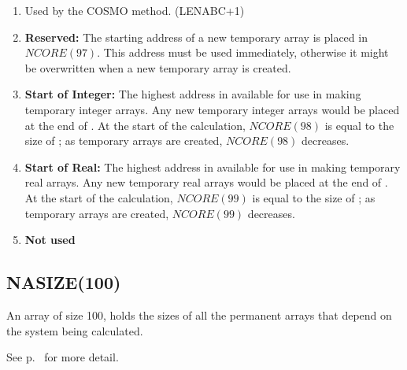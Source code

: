 \begin{enumerate}
\item {} Used by the COSMO method. (LENABC+1)
\addtocounter{enumi}{12}
\item {\bf Reserved:} The starting address of a new temporary array is
placed in $NCORE(97)$.  This address must be used immediately, otherwise
it might be overwritten when a new temporary array is created.
\item {\bf Start of Integer:} The highest address in  available
for use in making temporary integer arrays. Any new temporary integer arrays
would be placed at the end of .  At the start of the calculation,
$NCORE(98)$ is equal to the size of ; as temporary arrays are
created, $NCORE(98)$ decreases.
\item {\bf Start of Real:} The highest address in  available
for use in making temporary real arrays. Any new temporary real arrays
would be placed at the end of .  At the start of the calculation,
$NCORE(99)$ is equal to the size of ; as temporary arrays are
created, $NCORE(99)$ decreases.
\item {\bf Not used}
\end{enumerate}

\subsection*{NASIZE(100)}
An array of size 100,  holds the sizes of all the permanent arrays
that depend on the system being calculated. 
\begin{latexonly}
See p.~\pageref{nasize} for more detail.
\end{latexonly}
